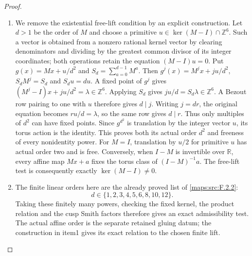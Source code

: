 \begin{proof}
\begin{enumerate}[label=\arabic*.]
\item We remove the existential free-lift condition by an explicit
construction. Let $d>1$ be the order of $M$ and choose a primitive
$u\in\ker(M-I)\cap\mathbb Z^6$. Such a vector is obtained from a
nonzero rational kernel vector by clearing denominators and dividing
by the greatest common divisor of its integer coordinates; both
operations retain the equation $(M-I)u=0$. Put
$g(x)=Mx+u/d^2$ and $S_d=\sum_{a=0}^{d-1}M^a$.
Then $g^j(x)=M^jx+ju/d^2$, $S_dM^j=S_d$ and $S_du=du$.
A fixed point of $g^j$ gives
$(M^j-I)x+ju/d^2=\lambda\in\mathbb Z^6$.
Applying $S_d$ gives $ju/d=S_d\lambda\in\mathbb Z^6$.
A Bezout row pairing to one with $u$ therefore gives $d\mid j$.
Writing $j=dr$, the original equation becomes $ru/d=\lambda$,
so the same row gives $d\mid r$. Thus only multiples of $d^2$
can have fixed points. Since $g^{d^2}$ is translation by the
integer vector $u$, its torus action is the identity. This proves
both its actual order $d^2$ and freeness of every nonidentity power.
For $M=I$, translation by $u/2$ for primitive $u$ has actual order
two and is free. Conversely, when $I-M$ is invertible over
$\mathbb R$, every affine map $Mx+a$ fixes the torus class of
$(I-M)^{-1}a$. The free-lift test is consequently exactly
$\ker(M-I)\ne0$.

\item The finite linear orders here are the already proved list of
\cref{maps:src:F.2.2}:
\[
 d\in\{1,2,3,4,5,6,8,10,12\}.
 \tag{F.CN1}\label{maps:eq:F.CN1}
\]
Taking these finitely many powers, checking the fixed kernel,
the product relation and the cusp Smith factors therefore gives
an exact admissibility test. The actual affine order is the
separate retained gluing datum; the construction in item1 gives
its exact relation to the chosen finite lift.


\end{enumerate}
\end{proof}
